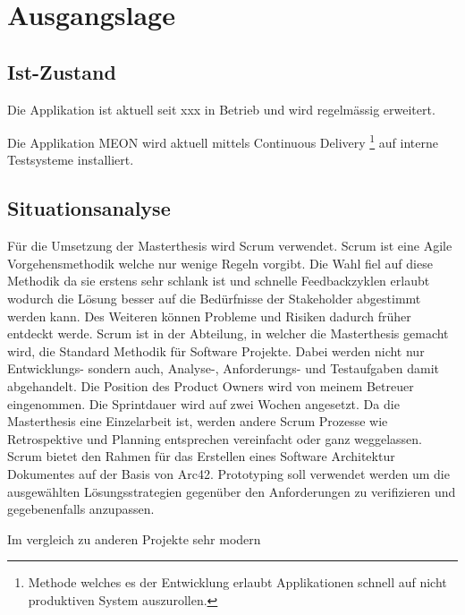 \graphicspath{{./images/}}

\chapter{Ausgangslage}

\section{Ist-Zustand}

Die Applikation ist aktuell seit xxx in Betrieb und wird regelmässig erweitert. 

Die Applikation MEON wird aktuell mittels Continuous Delivery \footnote{Methode welches es der Entwicklung erlaubt Applikationen schnell auf nicht produktiven System auszurollen.} auf interne Testsysteme installiert. 

\section{Situationsanalyse}

Für die Umsetzung der Masterthesis wird Scrum verwendet. Scrum ist eine Agile Vorgehensmethodik welche nur wenige Regeln vorgibt. Die Wahl fiel auf diese Methodik da sie erstens sehr schlank ist und schnelle Feedbackzyklen erlaubt wodurch die Lösung besser auf die Bedürfnisse der Stakeholder abgestimmt werden kann. Des Weiteren können Probleme und Risiken dadurch früher entdeckt werde. Scrum ist in der Abteilung, in welcher die Masterthesis gemacht wird, die Standard Methodik für Software Projekte. Dabei werden nicht nur Entwicklungs- sondern auch, Analyse-, Anforderungs- und Testaufgaben damit abgehandelt. Die Position des Product Owners wird von meinem Betreuer eingenommen. Die Sprintdauer wird auf zwei Wochen angesetzt. Da die Masterthesis eine Einzelarbeit ist, werden andere Scrum Prozesse wie Retrospektive und Planning entsprechen vereinfacht oder ganz weggelassen. Scrum bietet den Rahmen für das Erstellen eines Software Architektur Dokumentes auf der Basis von Arc42.
Prototyping soll verwendet werden um die ausgewählten Lösungsstrategien gegenüber den Anforderungen zu verifizieren und gegebenenfalls anzupassen.  

Im vergleich zu anderen Projekte sehr modern